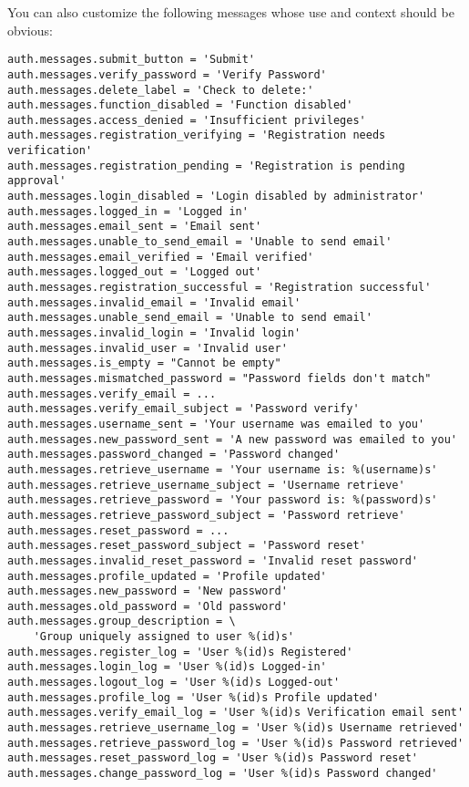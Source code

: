 \documentclass[justified,sixbynine,notoc]{tufte-book}
\begin{document}
\begin{fullwidth}
You can also customize the following messages whose use and context should be obvious:
\begin{lstlisting}
auth.messages.submit_button = 'Submit'
auth.messages.verify_password = 'Verify Password'
auth.messages.delete_label = 'Check to delete:'
auth.messages.function_disabled = 'Function disabled'
auth.messages.access_denied = 'Insufficient privileges'
auth.messages.registration_verifying = 'Registration needs verification'
auth.messages.registration_pending = 'Registration is pending approval'
auth.messages.login_disabled = 'Login disabled by administrator'
auth.messages.logged_in = 'Logged in'
auth.messages.email_sent = 'Email sent'
auth.messages.unable_to_send_email = 'Unable to send email'
auth.messages.email_verified = 'Email verified'
auth.messages.logged_out = 'Logged out'
auth.messages.registration_successful = 'Registration successful'
auth.messages.invalid_email = 'Invalid email'
auth.messages.unable_send_email = 'Unable to send email'
auth.messages.invalid_login = 'Invalid login'
auth.messages.invalid_user = 'Invalid user'
auth.messages.is_empty = "Cannot be empty"
auth.messages.mismatched_password = "Password fields don't match"
auth.messages.verify_email = ...
auth.messages.verify_email_subject = 'Password verify'
auth.messages.username_sent = 'Your username was emailed to you'
auth.messages.new_password_sent = 'A new password was emailed to you'
auth.messages.password_changed = 'Password changed'
auth.messages.retrieve_username = 'Your username is: %(username)s'
auth.messages.retrieve_username_subject = 'Username retrieve'
auth.messages.retrieve_password = 'Your password is: %(password)s'
auth.messages.retrieve_password_subject = 'Password retrieve'
auth.messages.reset_password = ...
auth.messages.reset_password_subject = 'Password reset'
auth.messages.invalid_reset_password = 'Invalid reset password'
auth.messages.profile_updated = 'Profile updated'
auth.messages.new_password = 'New password'
auth.messages.old_password = 'Old password'
auth.messages.group_description = \
    'Group uniquely assigned to user %(id)s'
auth.messages.register_log = 'User %(id)s Registered'
auth.messages.login_log = 'User %(id)s Logged-in'
auth.messages.logout_log = 'User %(id)s Logged-out'
auth.messages.profile_log = 'User %(id)s Profile updated'
auth.messages.verify_email_log = 'User %(id)s Verification email sent'
auth.messages.retrieve_username_log = 'User %(id)s Username retrieved'
auth.messages.retrieve_password_log = 'User %(id)s Password retrieved'
auth.messages.reset_password_log = 'User %(id)s Password reset'
auth.messages.change_password_log = 'User %(id)s Password changed'

\end{lstlisting}
\end{fullwidth}
\end{document}
